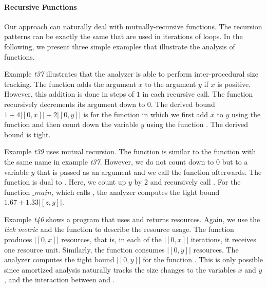 \documentclass[nocopyrightspace,preprint]{sigplanconf}
\begin{document}
\paragraph{Recursive Functions}

Our approach can naturally deal with mutually-recursive functions.
The recursion patterns can be exactly the same that are used in
iterations of loops.  In the following, we present three simple
examples that illustrate the analysis of functions.

Example \emph{t37} illustrates that the analyzer is able to perform
inter-procedural size tracking.  The function  adds the
argument $x$ to the argument $y$ if $x$ is positive.  However, this
addition is done in steps of $1$ in each recursive call.  The function
 recursively decrements its argument down to $0$.
The derived bound $1 + 4|[0, x]| + 2|[0, y]|$ is for the function
 in which we first add $x$ to $y$ using the function
 and then count down the variable $y$ using the function
.  The derived bound is tight.

Example \emph{t39} uses mutual recursion.  The function
 is similar to the function with the same name in
example \emph{t37}.  However, we do not count down to $0$ but to a
variable $y$ that is passed as an argument and we call the function
 afterwards.  The function  is dual to
.  Here, we count up $y$ by $2$ and recursively call
.  For the function $\_main$, which calls
, the analyzer computes the tight bound $1.67 +
1.33 |[z,y]|$.

Example \emph{t46} shows a program that uses and returns resources.
Again, we use the \emph{tick metric} and the function  to
describe the resource usage.  The function  produces
$|[0,x]|$ resources, that is, in each of the $|[0,x]|$ iterations, it
receives one resource unit.  Similarly, the function 
consumes $|[0,y]|$ resources.  The analyzer computes the tight bound
$|[0,y]|$ for the function .  This is only possible since
amortized analysis naturally tracks the size changes to the variables
$x$ and $y$, and the interaction between  and
.
\end{document}
